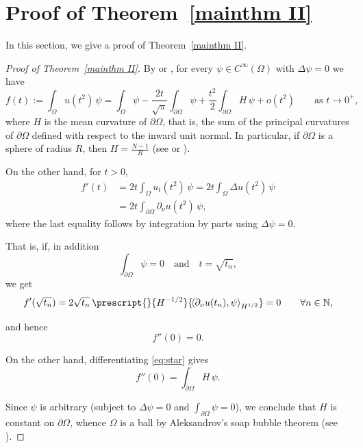 \documentclass[a4paper,11pt]{article}
\newcommand\restr[2]{{%
\left.\kern-\nulldelimiterspace %
#1 %
\vphantom{|} %
\right|_{#2} %
}}
\newcommand{\Pairing}[2]{
 \prescript{}{{H^{-1/2}}}{\!\left\langle #1, #2\right\rangle_{H^{1/2}}}
 } %
\numberwithin{equation}{section}
\begin{document}
\section{Proof of Theorem~\ref{mainthm II}}\label{section pf mainthm II}
In this section, we give a proof of Theorem~\ref{mainthm II}.
\begin{proof}[Proof of Theorem~\ref{mainthm II}]
By \cite[Theorem~1.2 and Theorem~1.3 (1): (a),(b)]{vandenberg&Gilkey&Seeley2008heat_content_asymptotics} or \cite[Theorem 2.3.3: 1., 2., 3.]{gilkey2003asymptotic}, for every $\psi\in C^\infty(\Omega)$ with $\Delta\psi=0$ we have
\begin{equation}\label{eq:star}
f(t):=\int_{\Omega} u(t^2)\,\psi
=\int_{\Omega}\psi
-\frac{2t}{\sqrt{\pi}}\int_{\partial\Omega}\psi
+\frac{t^2}{2}\int_{\partial\Omega} H\,\psi
+o(t^2)
\qquad \text{as }t\to 0^+,
\end{equation}
where $H$ is the mean curvature of $\partial\Omega$, that is, the sum of the principal curvatures of $\partial\Omega$ defined with respect to the inward unit normal. In particular, if $\partial\Omega$ is a sphere of radius $R$, then $H=\frac{N-1}{R}$ (see \cite[page 6] {gilkey2003asymptotic} or \cite{vandenberg&Gilkey&Seeley2008heat_content_asymptotics}).  

On the other hand, for $t>0$,
\begin{align*}
f'(t)
&=2t\int_{\Omega} u_t(t^2)\,\psi
=2t\int_{\Omega} \Delta u(t^2)\,\psi \\
&=2t\int_{\partial\Omega} \partial_{\nu} u(t^2)\,\psi,
\end{align*}
where the last equality follows by integration by parts using $\Delta \psi=0$.

That is, if, in addition
\begin{equation*}
    \int_{\partial\Omega}\psi=0
\quad\text{and}\quad
t=\sqrt{t_n},
\end{equation*}
we get
\begin{equation*}
f'(\sqrt{t_n})
=2\sqrt{t_n}\,\Pairing{ \partial_{\nu} u(t_n)}{\psi}
=0
\qquad \forall n\in\mathbb{N},
\end{equation*}

and hence
\begin{equation*}
f''(0)=0.
\end{equation*}

On the other hand, differentiating \eqref{eq:star} gives
\begin{equation*}
f''(0)=\int_{\partial\Omega} H\,\psi.  
\end{equation*}

Since $\psi$ is arbitrary (subject to $\Delta\psi=0$ and $\int_{\partial\Omega}\psi=0$), we conclude that $H$ is constant on $\partial\Omega$, whence $\Omega$ is a ball by Aleksandrov's soap bubble theorem (see \cite{aleksandrov1958uniqueness}).
\end{proof}
\end{document}
